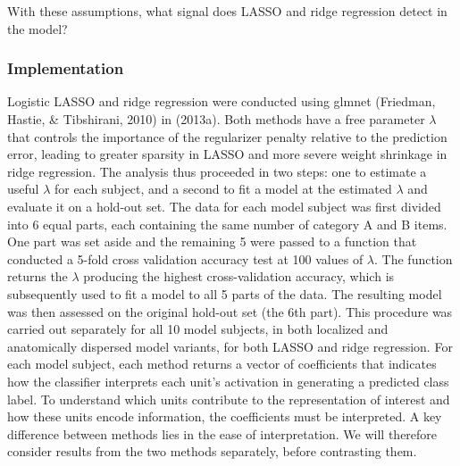 With these assumptions, what signal does LASSO and ridge regression detect in the model?

\subsubsection{Implementation}
Logistic LASSO and ridge regression were conducted using glmnet (Friedman, Hastie, \& Tibshirani, 2010) in \matlab (2013a). Both methods have a free parameter $\lambda$ that controls the importance of the regularizer penalty relative to the prediction error, leading to greater sparsity in LASSO and more severe weight shrinkage in ridge regression. The analysis thus proceeded in two steps: one to estimate a useful $\lambda$ for each subject, and a second to fit a model at the estimated $\lambda$ and evaluate it on a hold-out set. The data for each model subject was first divided into 6 equal parts, each containing the same number of category A and B items. One part was set aside and the remaining 5 were passed to a function that conducted a 5-fold cross validation accuracy test at 100 values of $\lambda$. The function returns the $\lambda$ producing the highest cross-validation accuracy, which is subsequently used to fit a model to all 5 parts of the data. The resulting model was then assessed on the original hold-out set (the 6th part). This procedure was carried out separately for all 10 model subjects, in both localized and anatomically dispersed model variants, for both LASSO and ridge regression. For each model subject, each method returns a vector of coefficients that indicates how the classifier interprets each unit's activation in generating a predicted class label. To understand which units contribute to the representation of interest and how these units encode information, the coefficients must be interpreted. A key difference between methods lies in the ease of interpretation. We will therefore consider results from the two methods separately, before contrasting them.

